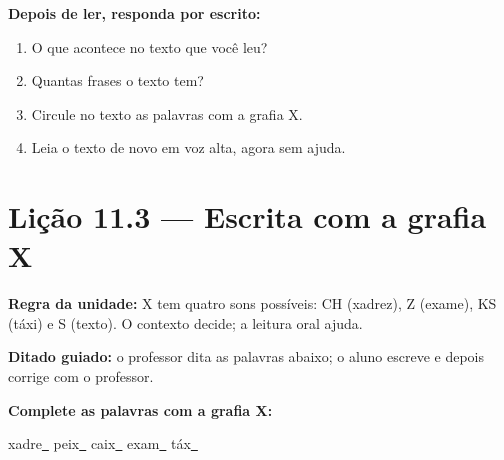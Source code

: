 \textbf{Depois de ler, responda por escrito:}
\begin{enumerate}

  \item O que acontece no texto que você leu?
  \begin{center}
  \underline{\hspace{12cm}}
  \end{center}

  \item Quantas frases o texto tem?
  \begin{center}
  \underline{\hspace{12cm}}
  \end{center}

  \item Circule no texto as palavras com a grafia X.

  \item Leia o texto de novo em voz alta, agora sem ajuda.

\end{enumerate}

\section{Lição 11.3 --- Escrita com a grafia X}

\noindent\textbf{Regra da unidade:} X tem quatro sons possíveis: CH (xadrez), Z (exame), KS (táxi) e S (texto). O contexto decide; a leitura oral ajuda.


\noindent\textbf{Ditado guiado:} o professor dita as palavras abaixo; o aluno escreve e depois corrige com o professor.

\begin{center}
  \underline{\hspace{2.3cm}} \quad \underline{\hspace{2.3cm}} \quad \underline{\hspace{2.3cm}} \quad \underline{\hspace{2.3cm}}

  \underline{\hspace{2.3cm}} \quad \underline{\hspace{2.3cm}} \quad \underline{\hspace{2.3cm}} \quad \underline{\hspace{2.3cm}}
\end{center}

\noindent\textbf{Complete as palavras com a grafia X:}
\begin{center}
  xadre\underline{~} \quad peix\underline{~} \quad caix\underline{~} \quad exam\underline{~} \quad táx\underline{~}
\end{center}

